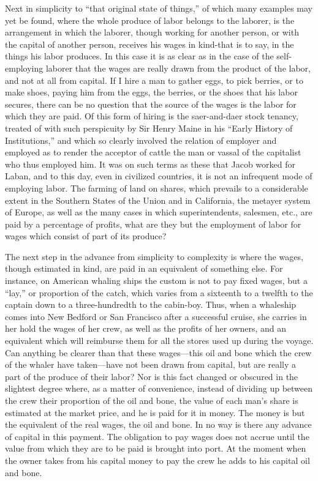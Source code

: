 Next in simplicity to ``that original state of things,'' of which many
examples may yet be found, where the whole produce of labor belongs to
the laborer, is the arrangement in which the laborer, though working for
another person, or with the capital of another person, receives his
wages in kind-that is to say, in the things his labor produces. In this
case it is as clear as in the case of the self-employing laborer that
the wages are really drawn from the product of the labor, and not at all
from capital. If I hire a man to gather eggs, to pick berries, or to
make shoes, paying him from the eggs, the berries, or the shoes that his
labor secures, there can be no question that the source of the wages is
the labor for which they are paid. Of this form of hiring is the
saer-and-daer stock tenancy, treated of with such perspicuity by Sir
Henry Maine in his ``Early History of Institutions,'' and which so
clearly involved the relation of employer and employed as to render the
acceptor of cattle the man or vassal of the capitalist who thus employed
him. It was on such terms as these that Jacob worked for Laban, and to
this day, even in civilized countries, it is not an infrequent mode of
employing labor. The farming of land on shares, which prevails to a
considerable extent in the Southern States of the Union and in
California, the metayer system of Europe, as well as the many cases in
which superintendents, salesmen, etc., are paid by a percentage of
profits, what are they but the employment of labor for wages which
consist of part of its produce?

The next step in the advance from simplicity to complexity is where the
wages, though estimated in kind, are paid in an equivalent of something
else. For instance, on American whaling ships the custom is not to pay
fixed wages, but a ``lay,'' or proportion of the catch, which varies
from a sixteenth to a twelfth to the captain down to a three-hundredth
to the cabin-boy. Thus, when a whaleship comes into New Bedford or San
Francisco after a successful cruise, she carries in her hold the wages
of her crew, as well as the profits of her owners, and an equivalent
which will reimburse them for all the stores used up during the voyage.
Can anything be clearer than that these wages---this oil and bone which
the crew of the whaler have taken---have not been drawn from capital,
but are really a part of the produce of their labor? Nor is this fact
changed or obscured in the slightest degree where, as a matter of
convenience, instead of dividing up between the crew their proportion of
the oil and bone, the value of each man's share is estimated at the
market price, and he is paid for it in money. The money is but the
equivalent of the real wages, the oil and bone. In no way is there any
advance of capital in this payment. The obligation to pay wages does not
accrue until the value from which they are to be paid is brought into
port. At the moment when the owner takes from his capital money to pay
the crew he adds to his capital oil and bone.

